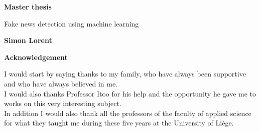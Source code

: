 ﻿\thispagestyle{plain}
\begin{center}
    \Large
    \textbf{Master thesis}
 
    \vspace{0.4cm}
    \large
    Fake news detection using machine learning
 
    \vspace{0.4cm}
    \textbf{Simon Lorent}
 
    \vspace{0.9cm}
    \textbf{Acknowledgement}
\end{center}
I would start by saying thanks to my family, who have always been supportive and who have always believed in me. \\
I would also thanks Professor Itoo for his help and the opportunity he gave me to works on this very interesting subject. \\
In addition I would also thank all the professors of the faculty of applied science for what they taught me during these five years at the University of Li\`ege. 